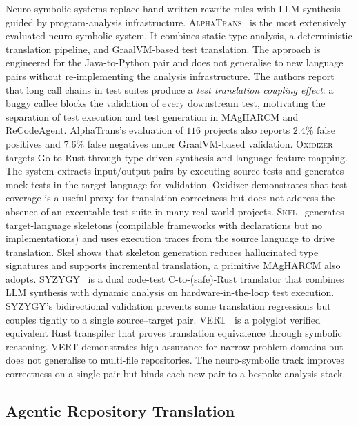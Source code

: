 Neuro-symbolic systems replace hand-written rewrite rules with LLM
synthesis guided by program-analysis infrastructure.
\textsc{AlphaTrans}~\cite{yang2024alphatrans,p02_alphatrans} is the
most extensively evaluated neuro-symbolic system. It combines static
type analysis, a deterministic translation pipeline, and
GraalVM-based test translation. The approach is engineered for the
Java-to-Python pair and does not generalise to new language pairs
without re-implementing the analysis infrastructure. The authors
report that long call chains in test suites produce a \emph{test
translation coupling effect}: a buggy callee blocks the validation of
every downstream test, motivating the separation of test execution
and test generation in MAgHARCM and ReCodeAgent. AlphaTrans's
evaluation of $116$ projects also reports $2.4\%$ false positives and
$7.6\%$ false negatives under GraalVM-based validation.
\textsc{Oxidizer}~\cite{siddiq2024oxidizer,p05_oxidizer} targets
Go-to-Rust through type-driven synthesis and language-feature mapping.
The system extracts input/output pairs by executing source tests and
generates mock tests in the target language for validation.
Oxidizer demonstrates that test coverage is a useful proxy for
translation correctness but does not address the absence of an
executable test suite in many real-world projects.
\textsc{Skel}~\cite{p64_skel,p65_skel_pldi} generates target-language
skeletons (compilable frameworks with declarations but no
implementations) and uses execution traces from the source language
to drive translation. Skel shows that skeleton generation reduces
hallucinated type signatures and supports incremental translation, a
primitive MAgHARCM also adopts. \textsc{SYZYGY}~\cite{p58_syzygy,p51_syzygy_arxiv}
is a dual code-test C-to-(safe)-Rust translator that combines LLM
synthesis with dynamic analysis on hardware-in-the-loop test
execution. SYZYGY's bidirectional validation prevents some
translation regressions but couples tightly to a single
source--target pair. \textsc{VERT}~\cite{p72_vert} is a polyglot
verified equivalent Rust transpiler that proves translation
equivalence through symbolic reasoning. VERT demonstrates high
assurance for narrow problem domains but does not generalise to
multi-file repositories. The neuro-symbolic track improves
correctness on a single pair but binds each new pair to a bespoke
analysis stack.

\subsection{Agentic Repository Translation}
\label{sec:related_agents}

